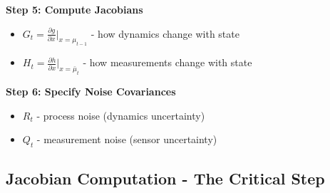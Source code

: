 \begin{tcolorbox}[colback=green!5!white,colframe=green!60!black,title=Dynamics Modeling Recipe]
\textbf{Step 5: Compute Jacobians}
\begin{itemize}
    \item $G_t = \frac{\partial g}{\partial x}\bigg|_{x=\mu_{t-1}}$ - how dynamics change with state
    \item $H_t = \frac{\partial h}{\partial x}\bigg|_{x=\bar{\mu}_t}$ - how measurements change with state
\end{itemize}

\textbf{Step 6: Specify Noise Covariances}
\begin{itemize}
    \item $R_t$ - process noise (dynamics uncertainty)
    \item $Q_t$ - measurement noise (sensor uncertainty)
\end{itemize}

\end{tcolorbox}

\subsection{Jacobian Computation - The Critical Step}

